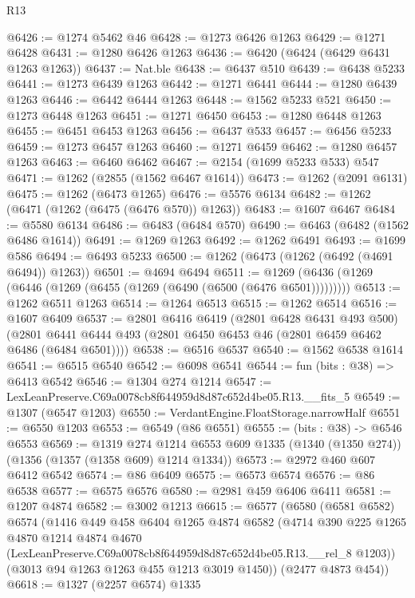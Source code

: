 \begin{lexlean}{R13}
\begin{coremodule}
@6426 := @1274 @5462 @46
@6428 := @1273 @6426 @1263
@6429 := @1271 @6428
@6431 := @1280 @6426 @1263
@6436 := @6420 (@6424 (@6429 @6431 @1263 @1263))
@6437 := Nat.ble
@6438 := @6437 @510
@6439 := @6438 @5233
@6441 := @1273 @6439 @1263
@6442 := @1271 @6441
@6444 := @1280 @6439 @1263
@6446 := @6442 @6444 @1263
@6448 := @1562 @5233 @521
@6450 := @1273 @6448 @1263
@6451 := @1271 @6450
@6453 := @1280 @6448 @1263
@6455 := @6451 @6453 @1263
@6456 := @6437 @533
@6457 := @6456 @5233
@6459 := @1273 @6457 @1263
@6460 := @1271 @6459
@6462 := @1280 @6457 @1263
@6463 := @6460 @6462
@6467 := @2154 (@1699 @5233 @533) @547
@6471 := @1262 (@2855 (@1562 @6467 @1614))
@6473 := @1262 (@2091 @6131)
@6475 := @1262 (@6473 @1265)
@6476 := @5576 @6134
@6482 := @1262 (@6471 (@1262 (@6475 (@6476 @570)) @1263))
@6483 := @1607 @6467
@6484 := @5580 @6134
@6486 := @6483 (@6484 @570)
@6490 := @6463 (@6482 (@1562 @6486 @1614))
@6491 := @1269 @1263
@6492 := @1262 @6491
@6493 := @1699 @586
@6494 := @6493 @5233
@6500 := @1262 (@6473 (@1262 (@6492 (@4691 @6494)) @1263))
@6501 := @4694 @6494
@6511 := @1269 (@6436 (@1269 (@6446 (@1269 (@6455 (@1269 (@6490 (@6500 (@6476 @6501)))))))))
@6513 := @1262 @6511 @1263
@6514 := @1264 @6513
@6515 := @1262 @6514
@6516 := @1607 @6409
@6537 := @2801
    @6416
    @6419
    (@2801 @6428 @6431 @493 @500)
    (@2801 @6441 @6444 @493 (@2801 @6450 @6453 @46 (@2801 @6459 @6462 @6486 (@6484 @6501))))
@6538 := @6516 @6537
@6540 := @1562 @6538 @1614
@6541 := @6515 @6540
@6542 := @6098 @6541
@6544 := fun (bits : @38) => @6413 @6542
@6546 := @1304 @274 @1214
@6547 := LexLeanPreserve.C69a0078cb8f644959d8d87c652d4be05.R13.__fits_5
@6549 := @1307 (@6547 @1203)
@6550 := VerdantEngine.FloatStorage.narrowHalf
@6551 := @6550 @1203
@6553 := @6549 (@86 @6551)
@6555 := (bits : @38) -> @6546 @6553
@6569 := @1319
    @274
    @1214
    @6553
    @609
    @1335
    (@1340 (@1350 @274))
    (@1356 (@1357 (@1358 @609) @1214 @1334))
@6573 := @2972 @460 @607 @6412 @6542
@6574 := @86 @6409
@6575 := @6573 @6574
@6576 := @86 @6538
@6577 := @6575 @6576
@6580 := @2981 @459 @6406 @6411
@6581 := @1207 @4874
@6582 := @3002 @1213
@6615 := @6577
    (@6580
      (@6581 @6582)
      @6574
      (@1416
        @449
        @458
        @6404
        @1265
        @4874
        @6582
        (@4714
          @390
          @225
          @1265
          @4870
          @1214
          @4874
          @4670
          (LexLeanPreserve.C69a0078cb8f644959d8d87c652d4be05.R13.__rel_8 @1203))
        (@3013 @94 @1263 @1263 @455 @1213 @3019 @1450))
      (@2477 @4873 @454))
@6618 := @1327 (@2257 @6574) @1335

\end{coremodule}
\end{lexlean}
